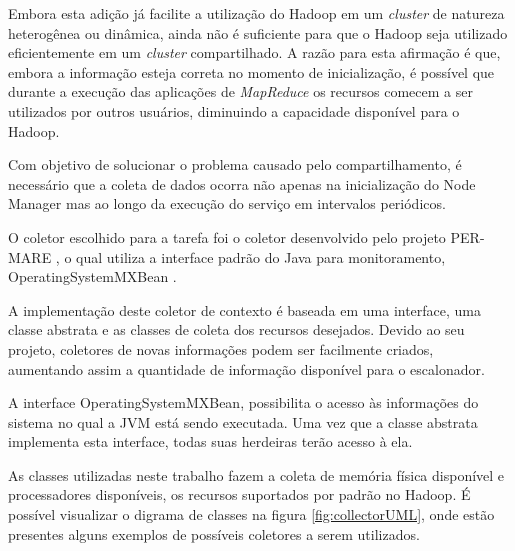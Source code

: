 Embora esta adição já facilite a utilização do Hadoop em um \textit{cluster} de natureza heterogênea ou dinâmica, ainda não é suficiente para que o Hadoop seja utilizado eficientemente em um \textit{cluster} compartilhado. A razão para esta afirmação é que, embora a informação esteja correta no momento de inicialização, é possível que durante a execução das aplicações de \textit{MapReduce} os recursos comecem a ser utilizados por outros usuários, diminuindo a capacidade disponível para o Hadoop.

Com objetivo de solucionar o problema causado pelo compartilhamento, é necessário que a coleta de dados ocorra não apenas na inicialização do Node Manager mas ao longo da execução do serviço em intervalos periódicos.

O coletor escolhido para a tarefa foi o coletor desenvolvido pelo projeto PER-MARE \cite{Collector}, o qual utiliza a interface padrão do Java para monitoramento, OperatingSystemMXBean \cite{MXBean}.

A implementação deste coletor de contexto é baseada em uma interface, uma classe abstrata e as classes de coleta dos recursos desejados. Devido ao seu projeto, coletores de novas informações podem ser facilmente criados, aumentando assim a quantidade de informação disponível para o escalonador.

A interface OperatingSystemMXBean, possibilita o acesso às informações do sistema no qual a JVM está sendo executada. Uma vez que a classe abstrata implementa esta interface, todas suas herdeiras terão acesso à ela.

As classes utilizadas neste trabalho fazem a coleta de memória física disponível e processadores disponíveis, os recursos suportados por padrão no Hadoop. É possível visualizar o digrama de classes na figura \ref{fig:collectorUML}, onde estão presentes alguns exemplos de possíveis coletores a serem utilizados.

